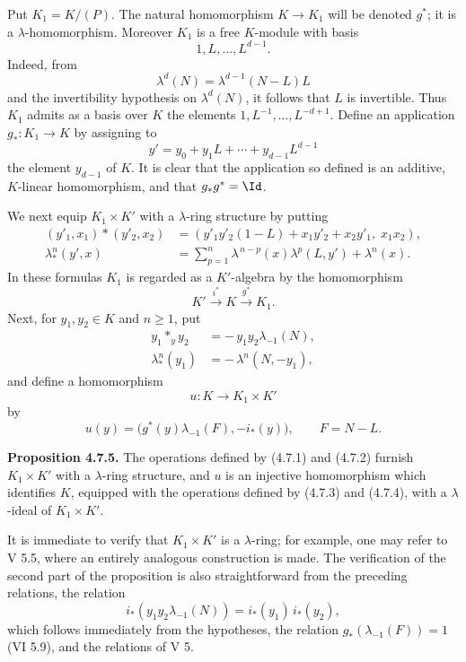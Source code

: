 Put \(K_1=K/(P)\). The natural homomorphism \(K\to K_1\) will be denoted \(g^*\); it is a \(\lambda\)-homomorphism. Moreover \(K_1\) is a free \(K\)-module with basis
\[
  1,L,\ldots,L^{d-1}.
\]
Indeed, from
\[
  \lambda^d(N)=\lambda^{d-1}(N-L)L
\]
and the invertibility hypothesis on \(\lambda^d(N)\), it follows that \(L\) is invertible. Thus \(K_1\) admits as a basis over \(K\) the elements \(1,L^{-1},\ldots,L^{-d+1}\). Define an application \(g_*:K_1\to K\) by assigning to
\[
y'=y_0+y_1L+\cdots+y_{d-1}L^{d-1}
\]
the element \(y_{d-1}\) of \(K\). It is clear that the application so defined is an additive, \(K\)-linear homomorphism, and that \(g_*g^*=\Id\).

We next equip \(K_1\times K'\) with a \(\lambda\)-ring structure by putting
\begin{align}
 (y'_1,x_1)*(y'_2,x_2)
   &=(y'_1y'_2(1-L)+x_1y'_2+x_2y'_1,\; x_1x_2), \tag{4.7.1}\\
 \lambda^n_*(y',x)
   &=\sum_{p=1}^{n}\lambda^{\,n-p}(x)\lambda^p(L,y')
     +\lambda^n(x). \tag{4.7.2}
\end{align}
In these formulas \(K_1\) is regarded as a \(K'\)-algebra by the homomorphism
\[
  K'\xrightarrow{i^*}K\xrightarrow{g^*}K_1.
\]
Next, for \(y_1,y_2\in K\) and \(n\ge1\), put
\begin{align}
 y_1*_y y_2&=-\,y_1y_2\lambda_{-1}(N), \tag{4.7.3}\\
 \lambda^n_*(y_1)&=-\,\lambda^n(N,-y_1), \tag{4.7.4}
\end{align}
and define a homomorphism
\[
  u:K\longrightarrow K_1\times K'
\]
by
\[
  u(y)=\bigl(g^*(y)\lambda_{-1}(F),-i_*(y)\bigr),
  \qquad F=N-L.
\]

\textbf{Proposition 4.7.5.} The operations defined by (4.7.1) and (4.7.2) furnish \(K_1\times K'\) with a \(\lambda\)-ring structure, and \(u\) is an injective homomorphism which identifies \(K\), equipped with the operations defined by (4.7.3) and (4.7.4), with a \(\lambda\)-ideal of \(K_1\times K'\).

It is immediate to verify that \(K_1\times K'\) is a \(\lambda\)-ring; for example, one may refer to V 5.5, where an entirely analogous construction is made. The verification of the second part of the proposition is also straightforward from the preceding relations, the relation
\[
  i_*(y_1y_2\lambda_{-1}(N))=i_*(y_1)\,i_*(y_2),
\]
which follows immediately from the hypotheses, the relation \(g_*(\lambda_{-1}(F))=1\) (VI 5.9), and the relations of V 5.

